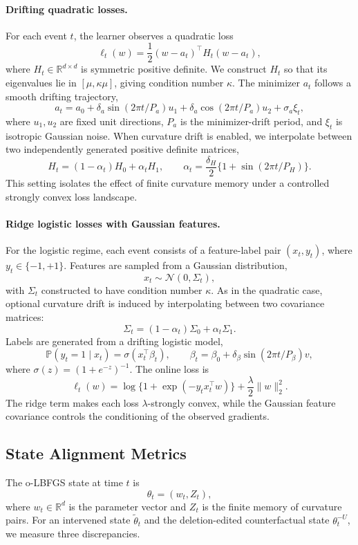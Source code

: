 \documentclass{ssl}
\begin{document}
\paragraph{Drifting quadratic losses.}
For each event \(t\), the learner observes a quadratic loss
\[
\ell_t(w)
=
\frac{1}{2}(w-a_t)^\top H_t(w-a_t),
\]
where \(H_t \in \mathbb{R}^{d \times d}\) is symmetric positive definite. We construct \(H_t\) so that its eigenvalues lie in \([\mu,\kappa\mu]\), giving condition number \(\kappa\). The minimizer \(a_t\) follows a smooth drifting trajectory,
\[
a_t
=
a_0
+
\delta_a \sin(2\pi t/P_a)u_1
+
\delta_a \cos(2\pi t/P_a)u_2
+
\sigma_a \xi_t,
\]
where \(u_1,u_2\) are fixed unit directions, \(P_a\) is the minimizer-drift period, and \(\xi_t\) is isotropic Gaussian noise. When curvature drift is enabled, we interpolate between two independently generated positive definite matrices,
\[
H_t=(1-\alpha_t)H_0+\alpha_t H_1,
\qquad
\alpha_t=\frac{\delta_H}{2}\{1+\sin(2\pi t/P_H)\}.
\]
This setting isolates the effect of finite curvature memory under a controlled strongly convex loss landscape.

\paragraph{Ridge logistic losses with Gaussian features.}
For the logistic regime, each event consists of a feature-label pair \((x_t,y_t)\), where \(y_t\in\{-1,+1\}\). Features are sampled from a Gaussian distribution,
\[
x_t \sim \mathcal{N}(0,\Sigma_t),
\]
with \(\Sigma_t\) constructed to have condition number \(\kappa\). As in the quadratic case, optional curvature drift is induced by interpolating between two covariance matrices:
\[
\Sigma_t=(1-\alpha_t)\Sigma_0+\alpha_t\Sigma_1.
\]
Labels are generated from a drifting logistic model,
\[
\mathbb{P}(y_t=1\mid x_t)=\sigma(x_t^\top \beta_t),
\qquad
\beta_t=\beta_0+\delta_\beta \sin(2\pi t/P_\beta)v,
\]
where \(\sigma(z)=(1+e^{-z})^{-1}\). The online loss is
\[
\ell_t(w)
=
\log\{1+\exp(-y_t x_t^\top w)\}
+
\frac{\lambda}{2}\|w\|_2^2.
\]
The ridge term makes each loss \(\lambda\)-strongly convex, while the Gaussian feature covariance controls the conditioning of the observed gradients.

\subsection{State Alignment Metrics}
The o-LBFGS state at time \(t\) is
\[
\theta_t=(w_t,Z_t),
\]
where \(w_t\in\mathbb{R}^d\) is the parameter vector and \(Z_t\) is the finite memory of curvature pairs. For an intervened state \(\tilde\theta_t\) and the deletion-edited counterfactual state \(\theta_t^{-U}\), we measure three discrepancies.
\end{document}
